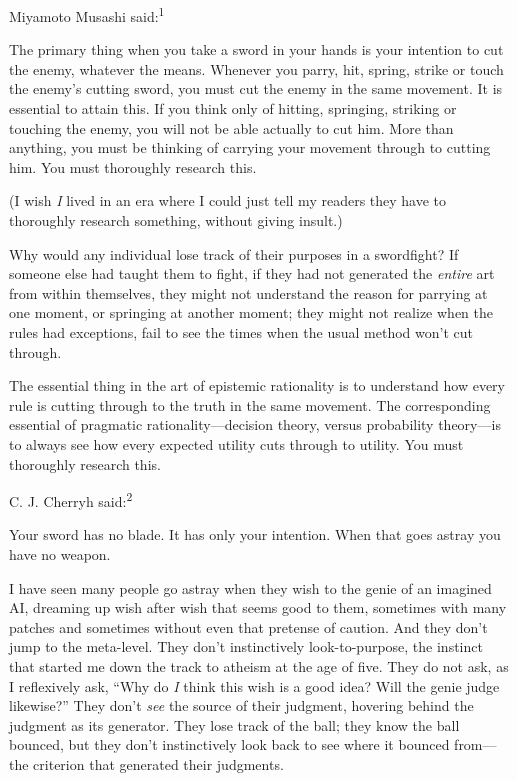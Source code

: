 {
 Miyamoto Musashi said:\textsuperscript{1}}

{
 The primary thing when you take a sword in your hands is your
intention to cut the enemy, whatever the means. Whenever you parry,
hit, spring, strike or touch the enemy's cutting sword,
you must cut the enemy in the same movement. It is essential to attain
this. If you think only of hitting, springing, striking or touching the
enemy, you will not be able actually to cut him. More than anything,
you must be thinking of carrying your movement through to cutting him.
You must thoroughly research this.}

{
 (I wish \textit{I} lived in an era where I could just tell my
readers they have to thoroughly research something, without giving
insult.)}

{
 Why would any individual lose track of their purposes in a
swordfight? If someone else had taught them to fight, if they had not
generated the \textit{entire} art from within themselves, they might
not understand the reason for parrying at one moment, or springing at
another moment; they might not realize when the rules had exceptions,
fail to see the times when the usual method won't cut
through.}

{
 The essential thing in the art of epistemic rationality is to
understand how every rule is cutting through to the truth in the same
movement. The corresponding essential of pragmatic
rationality---decision theory, versus probability theory---is to always
see how every expected utility cuts through to utility. You must
thoroughly research this.}

{
 C. J. Cherryh said:\textsuperscript{2}}

{
 Your sword has no blade. It has only your intention. When that
goes astray you have no weapon.}

{
 I have seen many people go astray when they wish to the genie of
an imagined AI, dreaming up wish after wish that seems good to them,
sometimes with many patches and sometimes without even that pretense of
caution. And they don't jump to the meta-level. They
don't instinctively look-to-purpose, the instinct that
started me down the track to atheism at the age of five. They do not
ask, as I reflexively ask, ``Why do \textit{I} think
this wish is a good idea? Will the genie judge
likewise?'' They don't \textit{see}
the source of their judgment, hovering behind the judgment as its
generator. They lose track of the ball; they know the ball bounced, but
they don't instinctively look back to see where it
bounced from---the criterion that generated their judgments.}

